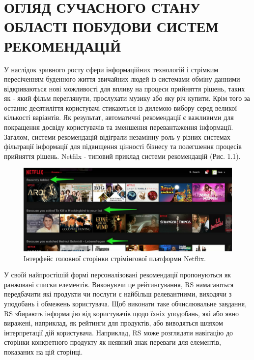 \newpage
\section{ОГЛЯД СУЧАСНОГО СТАНУ ОБЛАСТІ ПОБУДОВИ СИСТЕМ РЕКОМЕНДАЦІЙ}
У наслідок зривного росту сфери інформаційних технологій і стрімким пересіченням буденного життя звичайних людей із системами обміну данними відкриваються нові можливості для впливу на процеси прийняття рішень, таких як - який фільм переглянути, прослухати музику або яку річ купити. Крім того за останнє десятиліття користувачі стикаються із дилемою вибору серед великої кількості варіантів. Як результат, автоматичні рекомендації є важливими для покращення досвіду користувачів та зменшення перевантаження інформації. Загалом, системи рекомендацій відіграли незамінну роль у різних системах фільтрації інформації для підвищення цінності бізнесу та полегшення процесів прийняття рішень. Netfilx - типовий приклад системи рекомендацій (Рис. 1.1).

\begin{figure}[H]
    \centering
    \includegraphics[width=1\textwidth]{images/netflixl.png}
    \caption{Інтерфейс головної сторінки стрімінгової платформи Netflix. }

\end{figure}

У своїй найпростішій формі персоналізовані рекомендації пропонуються як ранжовані списки елементів. Виконуючи це рейтингування, RS намагаються передбачити які продукти чи послуги є найбільш релевантними, виходячи з уподобань і обмежень користувача. Щоб виконати таке обчислювальне завдання, RS збирають інформацію від користувачів щодо їхніх уподобань, які або явно виражені, наприклад, як рейтинги для продуктів, або виводяться шляхом інтерпретації дій користувача. Наприклад, RS може розглядати навігацію до сторінки конкретного продукту як неявний знак переваги для елементів, показаних на цій сторінці.

